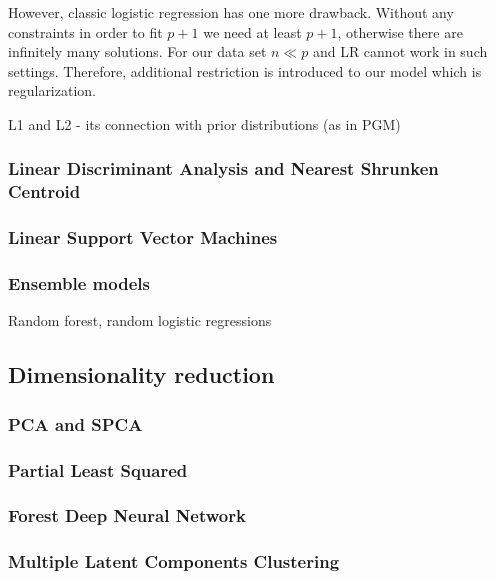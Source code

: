 \documentclass[12pt, wide]{mwart}
\begin{document}
However, classic logistic regression has one more drawback. Without any constraints in order to fit $p+1$ we need at least $p+1$, otherwise there are infinitely many solutions. For our data set $n \ll p$ and LR cannot work in such settings. Therefore, additional restriction is introduced to our model which is regularization. 




L1 and L2 - its connection with prior distributions (as in PGM)

\subsubsection{Linear Discriminant Analysis and Nearest Shrunken Centroid}

\subsubsection{Linear Support Vector Machines}

\subsubsection{Ensemble models}

Random forest, random logistic regressions


\subsection{Dimensionality reduction}

\subsubsection{PCA and SPCA}

\subsubsection{Partial Least Squared}

\subsubsection{Forest Deep Neural Network}

\subsubsection{Multiple Latent Components Clustering}
\end{document}
